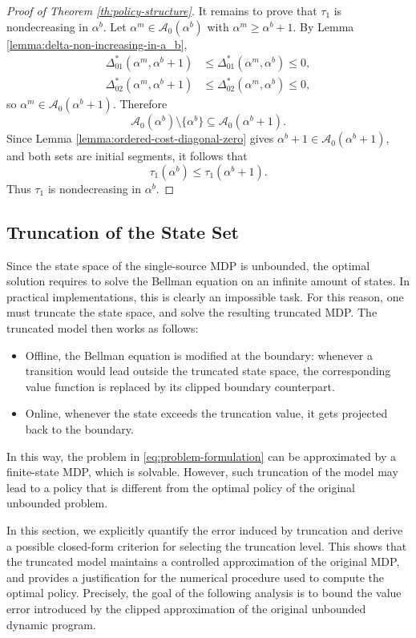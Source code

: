 \documentclass[letterpaper,journal]{IEEEtran}
\begin{document}
\begin{proof}[Proof of Theorem \ref{th:policy-structure}]
It remains to prove that $\tau_1$ is nondecreasing in $\alpha^b$. Let
$\alpha^m\in\mathcal A_0(\alpha^b)$ with $\alpha^m\ge \alpha^b+1$. By
Lemma \ref{lemma:delta-non-increasing-in-a_b},
\begin{align*}
\Delta^*_{01}(\alpha^m,\alpha^b+1)
&\le \Delta^*_{01}(\alpha^m,\alpha^b)\le 0,\\
\Delta^*_{02}(\alpha^m,\alpha^b+1)
&\le \Delta^*_{02}(\alpha^m,\alpha^b)\le 0,
\end{align*}
so $\alpha^m\in\mathcal A_0(\alpha^b+1)$. Therefore
\[
\mathcal A_0(\alpha^b)\setminus\{\alpha^b\}\subseteq \mathcal A_0(\alpha^b+1).
\]
Since Lemma \ref{lemma:ordered-cost-diagonal-zero} gives
$\alpha^b+1\in\mathcal A_0(\alpha^b+1)$, and both sets are initial segments, it follows that
\[
\tau_1(\alpha^b)\le \tau_1(\alpha^b+1).
\]
Thus $\tau_1$ is nondecreasing in $\alpha^b$.
\end{proof}



\subsection{Truncation of the State Set}

Since the state space of the single-source MDP is unbounded, the optimal solution requires to solve the Bellman equation on an infinite amount of states. In practical implementations, this is clearly an impossible task. For this reason, one must truncate the state space, and solve the resulting truncated MDP. The truncated model then works as follows:
\begin{itemize}
    \item Offline, the Bellman equation is modified at the boundary: whenever a transition would lead outside the truncated state space, the corresponding value function is replaced by its clipped boundary counterpart.
    \item Online, whenever the state exceeds the truncation value, it gets projected back to the boundary.
\end{itemize}
In this way, the problem in \eqref{eq:problem-formulation} can be approximated by a finite-state MDP, which is solvable. However, such truncation of the model may lead to a policy that is different from the optimal policy of the original unbounded problem.

In this section, we explicitly quantify the error induced by truncation and derive a possible closed-form criterion for selecting the truncation level. This shows that the truncated model maintains a controlled approximation of the original MDP, and provides a justification for the numerical procedure used to compute the optimal policy. Precisely, the goal of the following analysis is to bound the value error introduced by the clipped approximation of the original unbounded dynamic program.
\end{document}
